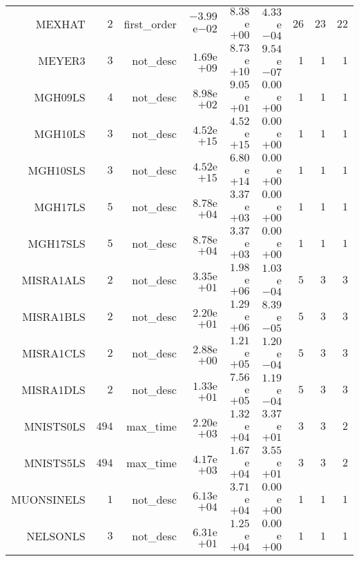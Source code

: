 \begin{longtable}{rrrrrrrrr}
MEXHAT & \(     2\) & first\_order & \(-3.99\)e\(-02\) & \( 8.38\)e\(+00\) & \( 4.33\)e\(-04\) & \(    26\) & \(    23\) & \(    22\) \\
MEYER3 & \(     3\) & not\_desc & \( 1.69\)e\(+09\) & \( 8.73\)e\(+10\) & \( 9.54\)e\(-07\) & \(     1\) & \(     1\) & \(     1\) \\
MGH09LS & \(     4\) & not\_desc & \( 8.98\)e\(+02\) & \( 9.05\)e\(+01\) & \( 0.00\)e\(+00\) & \(     1\) & \(     1\) & \(     1\) \\
MGH10LS & \(     3\) & not\_desc & \( 4.52\)e\(+15\) & \( 4.52\)e\(+15\) & \( 0.00\)e\(+00\) & \(     1\) & \(     1\) & \(     1\) \\
MGH10SLS & \(     3\) & not\_desc & \( 4.52\)e\(+15\) & \( 6.80\)e\(+14\) & \( 0.00\)e\(+00\) & \(     1\) & \(     1\) & \(     1\) \\
MGH17LS & \(     5\) & not\_desc & \( 8.78\)e\(+04\) & \( 3.37\)e\(+03\) & \( 0.00\)e\(+00\) & \(     1\) & \(     1\) & \(     1\) \\
MGH17SLS & \(     5\) & not\_desc & \( 8.78\)e\(+04\) & \( 3.37\)e\(+03\) & \( 0.00\)e\(+00\) & \(     1\) & \(     1\) & \(     1\) \\
MISRA1ALS & \(     2\) & not\_desc & \( 3.35\)e\(+01\) & \( 1.98\)e\(+06\) & \( 1.03\)e\(-04\) & \(     5\) & \(     3\) & \(     3\) \\
MISRA1BLS & \(     2\) & not\_desc & \( 2.20\)e\(+01\) & \( 1.29\)e\(+06\) & \( 8.39\)e\(-05\) & \(     5\) & \(     3\) & \(     3\) \\
MISRA1CLS & \(     2\) & not\_desc & \( 2.88\)e\(+00\) & \( 1.21\)e\(+05\) & \( 1.20\)e\(-04\) & \(     5\) & \(     3\) & \(     3\) \\
MISRA1DLS & \(     2\) & not\_desc & \( 1.33\)e\(+01\) & \( 7.56\)e\(+05\) & \( 1.19\)e\(-04\) & \(     5\) & \(     3\) & \(     3\) \\
MNISTS0LS & \(   494\) & max\_time & \( 2.20\)e\(+03\) & \( 1.32\)e\(+04\) & \( 3.37\)e\(+01\) & \(     3\) & \(     3\) & \(     2\) \\
MNISTS5LS & \(   494\) & max\_time & \( 4.17\)e\(+03\) & \( 1.67\)e\(+04\) & \( 3.55\)e\(+01\) & \(     3\) & \(     3\) & \(     2\) \\
MUONSINELS & \(     1\) & not\_desc & \( 6.13\)e\(+04\) & \( 3.71\)e\(+04\) & \( 0.00\)e\(+00\) & \(     1\) & \(     1\) & \(     1\) \\
NELSONLS & \(     3\) & not\_desc & \( 6.31\)e\(+01\) & \( 1.25\)e\(+04\) & \( 0.00\)e\(+00\) & \(     1\) & \(     1\) & \(     1\) \\

\end{longtable}
